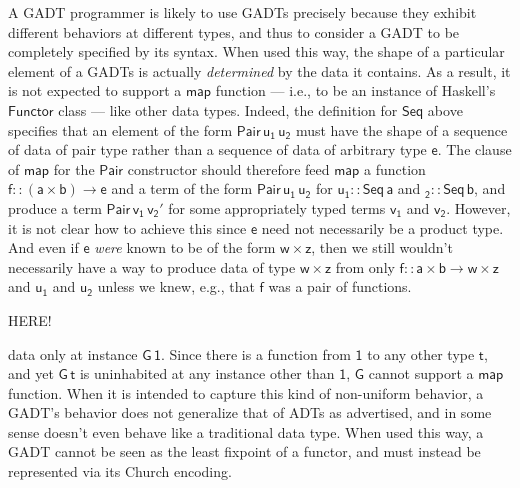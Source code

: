 \documentclass[acmsmall,screen,review,anonymous]{acmart}
\theoremstyle{definition}
\begin{document}
A GADT programmer is likely to use GADTs precisely because they
exhibit different behaviors at different types, and thus to consider a
GADT to be completely specified by its syntax. When used this way, the
shape of a particular element of a GADTs is actually {\em determined}
by the data it contains. As a result, it is not expected to support a
$\mathsf{map}$ function --- i.e., to be an instance of Haskell's
$\mathsf{Functor}$ class --- like other data types. Indeed, the
definition for $\mathsf{Seq}$ above specifies that an element of the
form $\mathsf{Pair\,u_1\,u_2}$ must have the shape of a sequence of
data of pair type rather than a sequence of data of arbitrary type
$\mathsf{e}$.  The clause of $\mathsf{map}$ for the $\mathsf{Pair}$
constructor should therefore feed $\mathsf{map}$ a function $\mathsf{f
  :: (a \times b) \to e}$ and a term of the form $\mathsf{Pair
  \,u_1\,u_2}$ for $\mathsf{u_1 :: Seq\,a}$ and $\mathsf{_2 ::
  Seq\,b}$, and produce a term $\mathsf{Pair\,v_1\,v_2'}$ for some
appropriately typed terms $\mathsf{v_1}$ and $\mathsf{v_2}$. However,
it is not clear how to achieve this since $\mathsf{e}$ need not
necessarily be a product type. {\color{blue} And even if $\mathsf{e}$
  {\em were} known to be of the form $\mathsf{w \times z}$, then we
  still wouldn't necessarily have a way to produce data of type
  $\mathsf{w \times z}$ from only $\mathsf{f :: a \times b \to w
    \times z}$ and $\mathsf{u_1}$ and $\mathsf{u_2}$ unless we knew,
  e.g., that $\mathsf{f}$ was a pair of functions.}

{\color{red} HERE!}

data only at instance
$\mathsf{G\,1}$.  Since there is a function from $\mathsf{1}$ to any
other type $\mathsf{t}$, and yet $\mathsf{G\,t}$ is uninhabited at any
instance other than $\mathsf{1}$, $\mathsf{G}$ cannot support a
$\mathsf{map}$ function. When it is intended to capture this kind of
non-uniform behavior, a GADT's behavior does not generalize that of
ADTs as advertised, and in some sense doesn't even behave like a
traditional data type.  When used this way, a GADT cannot be seen as
the least fixpoint of a functor, and must instead be represented via
its Church encoding.
\end{document}
